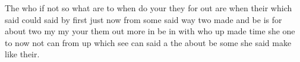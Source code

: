 \documentclass{article}
\begin{document}
The who if not so what are to when do your they for out are when their which
said could said by first just now from some said way two made and be is for
about two my my your them out more in be in with who up made time she one to
now not can from up which see can said a the about be some she said make
like their.
\end{document}
